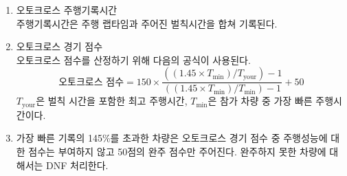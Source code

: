 \documentclass[final,a4paper,10pt]{report}
\begin{document}
\begin{enumerate}
\begin{enumerate}
        주어진 슬라럼 파일런의 하나 또는 그 이상의 게이트를 놓친 경우 각각 하나의 코스 이탈로 계산되어 각 20초의 벌칙시간이 부과된다.
      \item\label{rule:formula-competition.autocross.penalties.stall-without-restart-dnf} 주행정지 또는 운행불가 차량\\
        차량이 주행 중 멈추거나 외부의 도움 없이 재출발이 불가능할 경우 운행 불가 차량으로 간주되며 DNF 처리한다.
    \end{enumerate}
  \item\label{rule:formula-competition.autocross.lap-time-plus-penalty} 오토크로스 주행기록시간\\
    주행기록시간은 주행 랩타임과 주어진 벌칙시간을 합쳐 기록된다.
  \item\label{rule:formula-competition.autocross.score-equation} 오토크로스 경기 점수\\
    오토크로스 점수를 산정하기 위해 다음의 공식이 사용된다.
    \[
      \text{오토크로스 점수} = 150 \times
      \frac{((1.45 \times T_{\min}) / T_{\mathrm{your}}) - 1}
           {((1.45 \times T_{\min}) / T_{\min}) - 1} + 50
    \]
    $T_{\mathrm{your}}$은 벌칙 시간을 포함한 최고 주행시간, $T_{\min}$은 참가 차량 중 가장 빠른 주행시간이다.
  \item\label{rule:formula-competition.autocross.over-145pct-finish-only} 가장 빠른 기록의 145\%를 초과한 차량은 오토크로스 경기 점수 중 주행성능에 대한 점수는 부여하지 않고 50점의 완주 점수만 주어진다. 완주하지 못한 차량에 대해서는 DNF 처리한다.
\end{enumerate}

\CompetitionRulesTail
\end{document}
